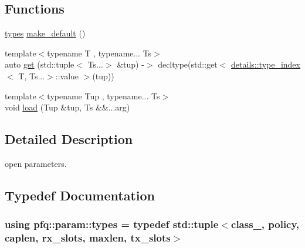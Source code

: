 \subsection*{Functions}
\begin{DoxyCompactItemize}
\item 
\hyperlink{namespacepfq_1_1param_ac57f6024bbd9785360348778c1105909}{types} \hyperlink{namespacepfq_1_1param_af1fd1aeb980688527db587b35f55abf2}{make\+\_\+default} ()
\item 
{\footnotesize template$<$typename T , typename... Ts$>$ }\\auto \hyperlink{namespacepfq_1_1param_a09da2abc1a228d7f77c35bed3bdb157d}{get} (std\+::tuple$<$ Ts...$>$ \&tup) -\/$>$ decltype(std\+::get$<$ \hyperlink{structpfq_1_1param_1_1details_1_1type__index}{details\+::type\+\_\+index}$<$ T, Ts...$>$\+::value $>$(tup))
\item 
{\footnotesize template$<$typename Tup , typename... Ts$>$ }\\void \hyperlink{namespacepfq_1_1param_aeabbdcec021e01a0a9321678fea99d8f}{load} (Tup \&tup, Ts \&\&...arg)
\end{DoxyCompactItemize}


\subsection{Detailed Description}
open parameters. 

\subsection{Typedef Documentation}
\hypertarget{namespacepfq_1_1param_ac57f6024bbd9785360348778c1105909}{
\subsubsection[{types}]{\setlength{\rightskip}{0pt plus 5cm}using {\bf pfq\+::param\+::types} = typedef std\+::tuple$<${\bf class\+\_\+}, {\bf policy}, {\bf caplen}, {\bf rx\+\_\+slots}, {\bf maxlen}, {\bf tx\+\_\+slots}$>$}}\label{namespacepfq_1_1param_ac57f6024bbd9785360348778c1105909}


